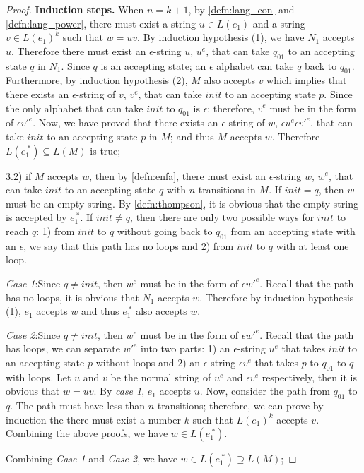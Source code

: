 \begin{proof}
\par \quad \textbf{Induction steps.} \quad When \(n = k + 1\), by
\autoref{defn:lang_con} and \autoref{defn:lang_power}, there must
exist a string \(u \in L(e_1)\) and a string \(v \in L(e_1)^k\) such
that \(w=uv\). By induction hypothesis (1), we have \(N_1\) accepts \(u\). Therefore there must exist an \(\epsilon\)-string
\(u\), \(u^e\), that can take \(q_{01}\) to an accepting state \(q\)
in \(N_1\). Since \(q\) is an accepting state; an \(\epsilon\)
alphabet can take \(q\) back to \(q_{01}\). Furthermore, by induction
hypothesis (2), \(M\) also accepts \(v\) which implies that there
exists an \(\epsilon\)-string of \(v\), \(v^e\), that can take
\(init\) to an accepting state \(p\). Since the only
alphabet that can take \(init\) to \(q_{01}\) is \(\epsilon\); therefore,
\(v^e\) must be in the form of \(\epsilon v'^e\). Now, we have proved
that there exists an \(\epsilon\) string of \(w\), \(\epsilon u^e\epsilon v'^e\), that can
take \(init\) to an accepting state \(p\) in \(M\); and thus \(M\)
accepts \(w\). Therefore \(L(e_1^{\ *}) \subseteq L(M)\) is true; 

\par 3.2) if \(M\) accepts \(w\), then by \autoref{defn:enfa}, there must exist an
\(\epsilon\)-string \(w\), \(w^e\), that can take \(init\) to an accepting
state \(q\) with \(n\) transitions in \(M\).  If \(init = q\), then \(w\) must be an empty
string. By \autoref{defn:thompson}, it is obvious that
the empty string is accepted by \(e_1^{\ *}\). If \(init \neq q\),
then there are only two possible ways for \(init\)
to reach \(q\): 1) from \(init\) to \(q\) without going back to
\(q_{01}\) from an accepting state with an \(\epsilon\), we say that this path has no loops and 2) from \(init\)
to \(q\) with at least one loop. 
\par \quad \textit{Case 1}:\quad Since \(q \neq init\), then \(w^e\) must
be in the form of \(\epsilon w'^e\). Recall that the path has no loops, it is
obvious that \(N_1\) accepts \(w\). Therefore by
induction hypothesis (1), \(e_1\) accepts \(w\) and thus \(e_1^{\ *}\)
also accepts \(w\). 
\par \quad \textit{Case 2}:\quad Since \(q \neq init\), then \(w^e\) must
be in the form of \(\epsilon w'^e\). Recall that the path has loops, we
can separate \(w'^e\) into two parts: 1) an \(\epsilon\)-string
\(u^e\) that takes \(init\) to an accepting state \(p\) without loops
and 2) an \(\epsilon\)-string \(\epsilon v^e\) that takes \(p\) to
\(q_{01}\) to \(q\) with loops. Let \(u\) and \(v\) be the normal
string of \(u^e\) and \(\epsilon v^e\) respectively, then it is obvious that
\(w = uv\). By \textit{case 1}, \(e_1\) accepts \(u\). Now, consider
the path from \(q_{01}\) to \(q\). The path must have less than \(n\)
transitions; therefore, we can prove by induction the there must exist a number \(k\) such that
\(L(e_1)^k\) accepts \(v\). Combining the above proofs, we have \(w \in
L(e_1^{\ *})\). 
\par \quad Combining \textit{Case 1} and \textit{Case 2}, we have \(w \in L(e_1^{\ *}) \supseteq L(M)\); 


\end{proof}
